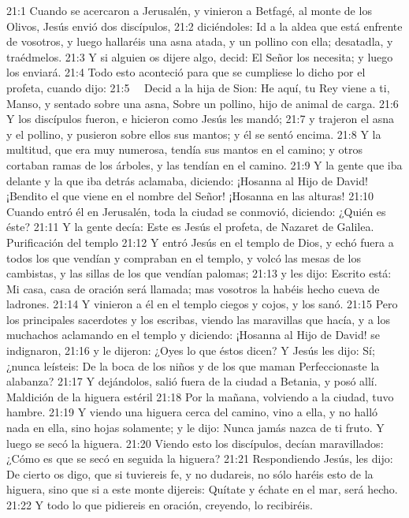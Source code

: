 21:1 Cuando se acercaron a Jerusalén, y vinieron a Betfagé, al monte de los Olivos, Jesús envió dos discípulos, 
21:2 diciéndoles: Id a la aldea que está enfrente de vosotros, y luego hallaréis una asna atada, y un pollino con ella; desatadla, y traédmelos. 
21:3 Y si alguien os dijere algo, decid: El Señor los necesita; y luego los enviará. 
21:4 Todo esto aconteció para que se cumpliese lo dicho por el profeta, cuando dijo: 
21:5   Decid a la hija de Sion: 
He aquí, tu Rey viene a ti, 
Manso, y sentado sobre una asna, 
Sobre un pollino, hijo de animal de carga. 
21:6 Y los discípulos fueron, e hicieron como Jesús les mandó; 
21:7 y trajeron el asna y el pollino, y pusieron sobre ellos sus mantos; y él se sentó encima. 
21:8 Y la multitud, que era muy numerosa, tendía sus mantos en el camino; y otros cortaban ramas de los árboles, y las tendían en el camino. 
21:9 Y la gente que iba delante y la que iba detrás aclamaba, diciendo: ¡Hosanna al Hijo de David! ¡Bendito el que viene en el nombre del Señor! ¡Hosanna en las alturas! 
21:10 Cuando entró él en Jerusalén, toda la ciudad se conmovió, diciendo: ¿Quién es éste? 
21:11 Y la gente decía: Este es Jesús el profeta, de Nazaret de Galilea. 
Purificación del templo  
21:12 Y entró Jesús en el templo de Dios, y echó fuera a todos los que vendían y compraban en el templo, y volcó las mesas de los cambistas, y las sillas de los que vendían palomas; 
21:13 y les dijo: Escrito está: Mi casa, casa de oración será llamada; mas vosotros la habéis hecho cueva de ladrones. 
21:14 Y vinieron a él en el templo ciegos y cojos, y los sanó. 
21:15 Pero los principales sacerdotes y los escribas, viendo las maravillas que hacía, y a los muchachos aclamando en el templo y diciendo: ¡Hosanna al Hijo de David! se indignaron, 
21:16 y le dijeron: ¿Oyes lo que éstos dicen? Y Jesús les dijo: Sí; ¿nunca leísteis: 
De la boca de los niños y de los que maman 
Perfeccionaste la alabanza? 
21:17 Y dejándolos, salió fuera de la ciudad a Betania, y posó allí. 
Maldición de la higuera estéril  
21:18 Por la mañana, volviendo a la ciudad, tuvo hambre. 
21:19 Y viendo una higuera cerca del camino, vino a ella, y no halló nada en ella, sino hojas solamente; y le dijo: Nunca jamás nazca de ti fruto. Y luego se secó la higuera. 
21:20 Viendo esto los discípulos, decían maravillados: ¿Cómo es que se secó en seguida la higuera? 
21:21 Respondiendo Jesús, les dijo: De cierto os digo, que si tuviereis fe, y no dudareis, no sólo haréis esto de la higuera, sino que si a este monte dijereis: Quítate y échate en el mar, será hecho. 
21:22 Y todo lo que pidiereis en oración, creyendo, lo recibiréis. 
